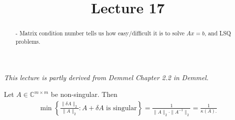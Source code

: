 \documentclass{ximera}
\begin{document}
    \title{Lecture 17}
    
    \begin{abstract} 
        - Matrix condition number tells us how easy/difficult it is to solve $Ax = b$, and LSQ problems.
    \end{abstract}
    \maketitle

\textit{This lecture is partly derived from Demmel Chapter 2.2 in Demmel.}


    \begin{theorem}
        Let $A \in \mathbb{C}^{m\times m}$ be non-singular.  Then 
        \begin{align*}
            \min \left\{\frac{\|\delta A\|_2}{\|A\|_2}: A+ \delta A \text{ is singular}\right\} = \frac{1}{\|A\|_2\cdot \|A^{-1}\|_2} = \frac{1}{\kappa(A).}
        \end{align*}
    \end{theorem}
\end{document}
